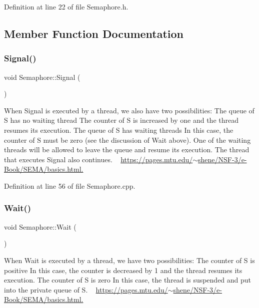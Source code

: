 Definition at line 22 of file Semaphore.\+h.



\subsection{Member Function Documentation}
\mbox{\label{class_semaphore_a86f92f738b4486439b296d8e235895f2}} 
\subsubsection{\texorpdfstring{Signal()}{Signal()}}
{\footnotesize\ttfamily void Semaphore\+::\+Signal (\begin{DoxyParamCaption}{ }\end{DoxyParamCaption})}



When Signal is executed by a thread, we also have two possibilities\+: The queue of S has no waiting thread The counter of S is increased by one and the thread resumes its execution. The queue of S has waiting threads In this case, the counter of S must be zero (see the discussion of Wait above). One of the waiting threads will be allowed to leave the queue and resume its execution. The thread that executes Signal also continues. ~\newline
\hyperlink{}{https\+://pages.\+mtu.\+edu/$\sim$shene/\+N\+S\+F-\/3/e-\/\+Book/\+S\+E\+M\+A/basics.\+html.}



Definition at line 56 of file Semaphore.\+cpp.

\mbox{\label{class_semaphore_a72aabebf026e3a8b1f3e4d0fa8ee1eda}} 
\subsubsection{\texorpdfstring{Wait()}{Wait()}\hspace{0.1cm}{\footnotesize\ttfamily [1/2]}}
{\footnotesize\ttfamily void Semaphore\+::\+Wait (\begin{DoxyParamCaption}{ }\end{DoxyParamCaption})}



When Wait is executed by a thread, we have two possibilities\+: The counter of S is positive In this case, the counter is decreased by 1 and the thread resumes its execution. The counter of S is zero In this case, the thread is suspended and put into the private queue of S. ~\newline
\hyperlink{}{https\+://pages.\+mtu.\+edu/$\sim$shene/\+N\+S\+F-\/3/e-\/\+Book/\+S\+E\+M\+A/basics.\+html.}



